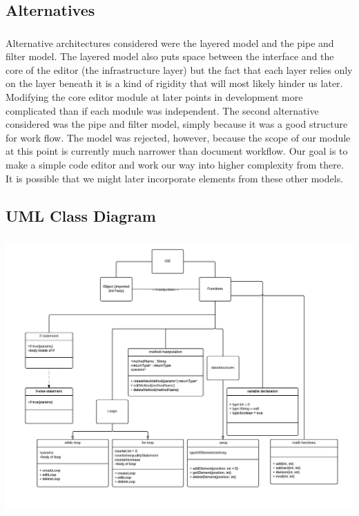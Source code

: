 \documentclass{llncs}
\begin{document}
\subsection{Alternatives}
\subsubsection{}
Alternative architectures considered were the layered model and the pipe and filter model. The layered model also puts space between the interface and the core of the editor (the infrastructure layer) but the fact that each layer relies only on the layer beneath it is a kind of rigidity that will most likely hinder us later. Modifying the core editor module at later points in development more complicated than if each module was independent. The second alternative considered was the pipe and filter model, simply because it was a good structure for work flow. The model was rejected, however, because the scope of our module at this point is currently much narrower than document workflow. Our goal is to make a simple code editor and work our way into higher complexity from there. It is possible that we might later incorporate elements from these other models.

\subsection{UML Class Diagram}
\subsubsection{}
\includegraphics[]{visual_editor_uml.png}
\end{document}
